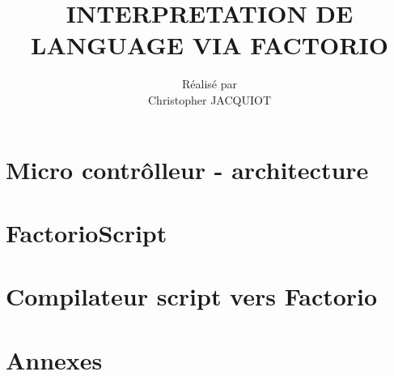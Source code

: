 \documentclass{scrreprt}
\title{\Huge \bfseries INTERPRETATION DE LANGUAGE VIA FACTORIO}
\author{Réalisé par \\Christopher JACQUIOT}
\date{}
\begin{document}
	
	
	
	\maketitle
	
	\tableofcontents
	\listoffigures
	
	
	
	
	
	
	
	
	
	
	\part{Micro contrôlleur - architecture}
	
	
	
	
	
	
	
	
	
	\part{FactorioScript}
	
	
	
	
	\part{Compilateur script vers Factorio}
	
	
	
	
	\cleardoublepage
	\pagebreak
	\part{Annexes}
	
	
	
	
	
	
	
	\begin{thebibliography}{}
	\end{thebibliography}
	
\end{document}
